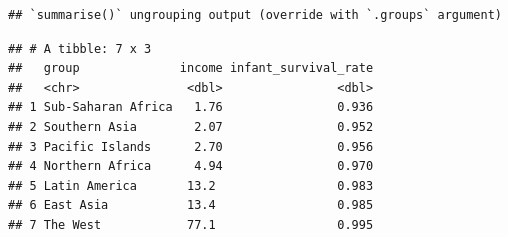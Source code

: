 \documentclass[
]{article}
\newenvironment{Shaded}{\begin{snugshade}}{\end{snugshade}}
\newcommand{\CommentTok}[1]{\textcolor[rgb]{0.56,0.35,0.01}{\textit{#1}}}
\newcommand{\DataTypeTok}[1]{\textcolor[rgb]{0.13,0.29,0.53}{#1}}
\newcommand{\DecValTok}[1]{\textcolor[rgb]{0.00,0.00,0.81}{#1}}
\newcommand{\FloatTok}[1]{\textcolor[rgb]{0.00,0.00,0.81}{#1}}
\newcommand{\KeywordTok}[1]{\textcolor[rgb]{0.13,0.29,0.53}{\textbf{#1}}}
\newcommand{\NormalTok}[1]{#1}
\newcommand{\OperatorTok}[1]{\textcolor[rgb]{0.81,0.36,0.00}{\textbf{#1}}}
\newcommand{\OtherTok}[1]{\textcolor[rgb]{0.56,0.35,0.01}{#1}}
\newcommand{\StringTok}[1]{\textcolor[rgb]{0.31,0.60,0.02}{#1}}
\begin{document}
\begin{verbatim}
## `summarise()` ungrouping output (override with `.groups` argument)
\end{verbatim}

\begin{Shaded}
\end{Shaded}

\begin{verbatim}
## # A tibble: 7 x 3
##   group              income infant_survival_rate
##   <chr>               <dbl>                <dbl>
## 1 Sub-Saharan Africa   1.76                0.936
## 2 Southern Asia        2.07                0.952
## 3 Pacific Islands      2.70                0.956
## 4 Northern Africa      4.94                0.970
## 5 Latin America       13.2                 0.983
## 6 East Asia           13.4                 0.985
## 7 The West            77.1                 0.995
\end{verbatim}

\begin{Shaded}
\end{Shaded}
\end{document}
